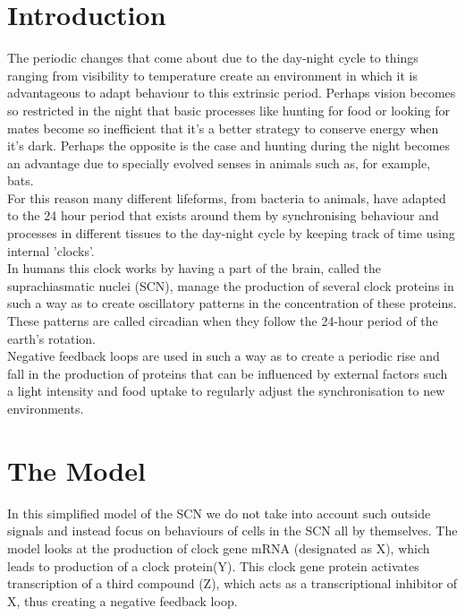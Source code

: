 	\section{Introduction}
    The periodic changes that come about due to the day-night cycle to things ranging from visibility to temperature create an environment in which it is advantageous to adapt behaviour to this extrinsic period. Perhaps vision becomes so restricted in the night that basic processes like hunting for food or looking for mates become so inefficient that it's a better strategy to conserve energy when it's dark. Perhaps the opposite is the case and hunting during the night becomes an advantage due to specially evolved senses in animals such as, for example, bats. \\
    
    For this reason many different lifeforms, from bacteria to animals, have adapted to the 24 hour period that exists around them by synchronising behaviour and processes in different tissues to the day-night cycle by keeping track of time using internal 'clocks'. \\
    
    In humans this clock works by having a part of the brain, called the suprachiasmatic nuclei (SCN), manage the production of several clock proteins in such a way as to create oscillatory patterns in the concentration of these proteins. These patterns are called circadian when they follow the 24-hour period of the earth's rotation. \\
    
    Negative feedback loops are used in such a way as to create a periodic rise and fall in the production of proteins that can be influenced by external factors such a light intensity and food uptake to regularly adjust the synchronisation to new environments. \par

	\section{The Model}
In this simplified model of the SCN we do not take into account such outside signals and instead focus on behaviours of cells in the SCN all by themselves. The model looks at the production of clock gene mRNA (designated as X), which leads to production of a clock protein(Y). This clock gene protein activates transcription of a third compound (Z), which acts as a transcriptional inhibitor of X, thus creating a negative feedback loop. \\
    

